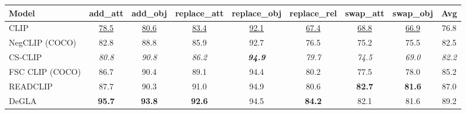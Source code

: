 \begin{tabular}{lcccccccc}
\toprule
Model & add\_att & add\_obj & replace\_att & replace\_obj & replace\_rel & swap\_att & swap\_obj & Avg \\
\midrule
CLIP & \underline{78.5} & \underline{80.6} & \underline{83.4} & \underline{92.1} & \underline{67.4} & \underline{68.8} & \underline{66.9} & 76.8 \\
NegCLIP (COCO) & 82.8 & 88.8 & 85.9 & 92.7 & 76.5 & 75.2 & 75.5 & 82.5 \\
CS-CLIP & \emph{80.8} & \emph{90.8} & \emph{86.2} & \emph{\textbf{94.9}} & \emph{79.7} & \emph{74.5} & \emph{69.0} & \emph{82.2} \\
FSC CLIP (COCO) & 86.7 & 90.4 & 89.1 & 94.4 & 80.2 & 77.5 & 78.0 & 85.2 \\
READCLIP & 87.7 & 90.3 & 91.0 & 94.9 & 80.6 & \textbf{82.7} & \textbf{81.6} & 87.0 \\
DeGLA & \textbf{95.7} & \textbf{93.8} & \textbf{92.6} & 94.5 & \textbf{84.2} & 82.1 & 81.6 & 89.2 \\
\bottomrule
\end{tabular}